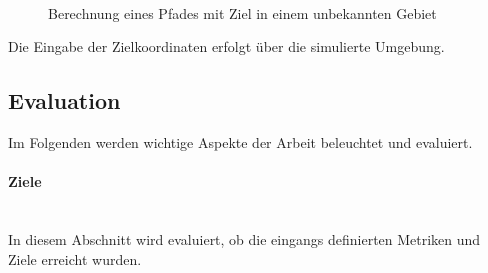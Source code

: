 \begin{enumerate}[leftmargin=*]
    \begin{figure}[H]
        \centering
        \\
        \caption{Berechnung eines Pfades mit Ziel in einem unbekannten Gebiet}
        \label{fig:pathfindingUnknown}
    \end{figure}

    Die Eingabe der Zielkoordinaten erfolgt über die simulierte Umgebung.
\end{enumerate}

\subsection{Evaluation}
Im Folgenden werden wichtige Aspekte der Arbeit beleuchtet und evaluiert.

\paragraph{Ziele} \mbox{}\\
In diesem Abschnitt wird evaluiert, ob die eingangs definierten Metriken und Ziele erreicht wurden.

